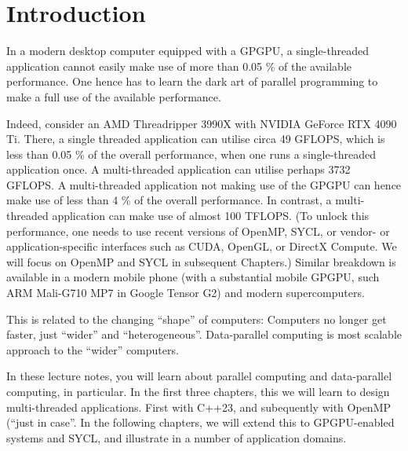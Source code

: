 \chapter{Introduction}

In a modern desktop computer equipped with a GPGPU, a single-threaded application cannot easily make use of more than 0.05 \% of the available performance. One hence has to learn the dark art of parallel programming to make a full use of the available performance.  

Indeed, consider an AMD Threadripper 3990X with NVIDIA GeForce RTX 4090 Ti. There, a single threaded application can utilise circa 49 GFLOPS, which is less than 0.05 \% of the overall performance, when one runs a single-threaded application once.
A multi-threaded application can utilise perhaps 3732 GFLOPS. A multi-threaded application not making use of the GPGPU can hence make use of less than 4 \%  of the overall performance. 
In contrast, a multi-threaded application can make use of almost 100 TFLOPS.
(To unlock this performance, one needs to use recent versions of OpenMP, SYCL, or vendor- or application-specific interfaces such as CUDA, OpenGL, or DirectX Compute. We will focus on OpenMP and SYCL in subsequent Chapters.)
Similar breakdown is available in a modern mobile phone (with a substantial mobile GPGPU, such ARM Mali-G710 MP7 in Google Tensor G2) and modern supercomputers.

This is related to the changing ``shape'' of computers: Computers no longer get faster, just ``wider'' and ``heterogeneous''. Data-parallel computing is most scalable approach to the ``wider'' computers.
  
In these lecture notes, you will learn about parallel computing and data-parallel computing, in particular. 
In the first three chapters, this we will learn to design multi-threaded applications. First with C++23, and subequently with OpenMP (``just in case''. In the following chapters, we will extend this to GPGPU-enabled systems and SYCL, and illustrate in a number of application domains.  

